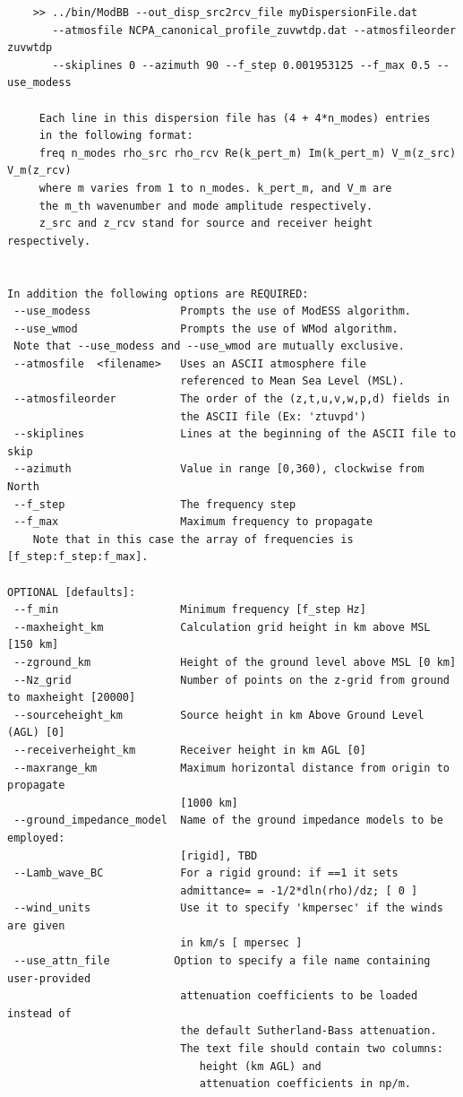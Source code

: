 \begin{verbatim}
    >> ../bin/ModBB --out_disp_src2rcv_file myDispersionFile.dat 
       --atmosfile NCPA_canonical_profile_zuvwtdp.dat --atmosfileorder zuvwtdp 
       --skiplines 0 --azimuth 90 --f_step 0.001953125 --f_max 0.5 --use_modess

     Each line in this dispersion file has (4 + 4*n_modes) entries
     in the following format:
     freq n_modes rho_src rho_rcv Re(k_pert_m) Im(k_pert_m) V_m(z_src) V_m(z_rcv)
     where m varies from 1 to n_modes. k_pert_m, and V_m are
     the m_th wavenumber and mode amplitude respectively.
     z_src and z_rcv stand for source and receiver height respectively.


In addition the following options are REQUIRED:
 --use_modess              Prompts the use of ModESS algorithm.
 --use_wmod                Prompts the use of WMod algorithm.
 Note that --use_modess and --use_wmod are mutually exclusive.
 --atmosfile  <filename>   Uses an ASCII atmosphere file
                           referenced to Mean Sea Level (MSL).
 --atmosfileorder          The order of the (z,t,u,v,w,p,d) fields in 
                           the ASCII file (Ex: 'ztuvpd')
 --skiplines               Lines at the beginning of the ASCII file to skip
 --azimuth                 Value in range [0,360), clockwise from North
 --f_step                  The frequency step
 --f_max                   Maximum frequency to propagate
    Note that in this case the array of frequencies is [f_step:f_step:f_max].

OPTIONAL [defaults]:
 --f_min                   Minimum frequency [f_step Hz] 
 --maxheight_km            Calculation grid height in km above MSL [150 km]
 --zground_km              Height of the ground level above MSL [0 km]
 --Nz_grid                 Number of points on the z-grid from ground to maxheight [20000]
 --sourceheight_km         Source height in km Above Ground Level (AGL) [0]
 --receiverheight_km       Receiver height in km AGL [0]
 --maxrange_km             Maximum horizontal distance from origin to propagate
                           [1000 km]
 --ground_impedance_model  Name of the ground impedance models to be employed:
                           [rigid], TBD
 --Lamb_wave_BC            For a rigid ground: if ==1 it sets
                           admittance= = -1/2*dln(rho)/dz; [ 0 ]
 --wind_units              Use it to specify 'kmpersec' if the winds are given
                           in km/s [ mpersec ]
 --use_attn_file          Option to specify a file name containing user-provided
                           attenuation coefficients to be loaded instead of 
                           the default Sutherland-Bass attenuation. 
                           The text file should contain two columns: 
                              height (km AGL) and 
                              attenuation coefficients in np/m.


\end{verbatim}
